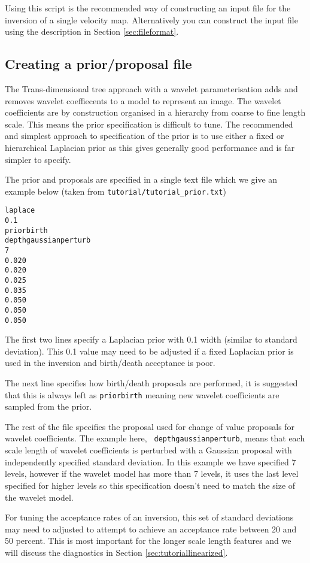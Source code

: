 \documentclass[a4paper,12pt]{article}
\begin{document}
Using this script is the recommended way of constructing an input file
for the inversion of a single velocity map. Alternatively you can
construct the input file using the description in Section \ref{sec:fileformat}.

\subsection{Creating a prior/proposal file}

The Trans-dimensional tree approach with a wavelet parameterisation adds and removes
wavelet coeffiecents to a model to represent an image. The wavelet coefficients are
by construction organised in a hierarchy from coarse to fine length scale. This
means the prior specification is difficult to tune. The recommended and simplest
approach to specification of the prior is to use either a fixed or hierarchical
Laplacian prior as this gives generally good performance and is far simpler to
specify.

The prior and proposals are specified in a single text file which we give
an example below (taken from {\tt tutorial/tutorial\_prior.txt})

\begin{verbatim}
laplace
0.1
priorbirth
depthgaussianperturb
7
0.020
0.020
0.025
0.035
0.050
0.050
0.050
\end{verbatim}

The first two lines specify a Laplacian prior with 0.1 width (similar to standard
deviation). This 0.1 value may need to be adjusted if a fixed Laplacian prior is
used in the inversion and birth/death acceptance is poor.

The next line specifies how birth/death proposals are performed, it is
suggested that this is always left as {\tt priorbirth} meaning new
wavelet coefficients are sampled from the prior.

The rest of the file specifies the proposal used for change of value
proposals for wavelet coefficients. The example here, {\tt
  depthgaussianperturb}, means that each scale length of wavelet
coefficients is perturbed with a Gaussian proposal with independently
specified standard deviation. In this example we have specified 7
levels, however if the wavelet model has more than 7 levels, it uses
the last level specified for higher levels so this specification
doesn't need to match the size of the wavelet model.

For tuning the acceptance rates of an inversion, this set of standard
deviations may need to adjusted to attempt to achieve an acceptance
rate between 20 and 50 percent. This is most important for the longer
scale length features and we will discuss the diagnostics in Section
\ref{sec:tutoriallinearized}.
\end{document}
